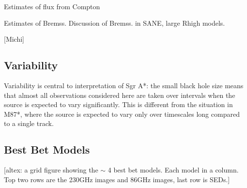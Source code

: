 Estimates of flux from Compton

Estimates of Bremss.  Discussion of Bremss. in SANE, large Rhigh models.

[Michi]

\subsection{Variability}

Variability is central to interpretation of Sgr A*: the small black hole size means that almost all observations considered here are taken over intervals when the source is expected to vary significantly.  This is different from the situation in M87*, where the source is expected to vary only over timescales long compared to a single track.

\subsection{Best Bet Models}

\begin{figure*}
    \centering
    [altex: a grid figure showing the $\sim$ 4 best bet models.  Each model in a column.  Top two rows are the 230GHz images and 86GHz images, last row is SEDs.]
    \caption{Best bet models.  Each column corresponds to one best bet model, top row shows the 230GHz image, middle row shows the 86GHz images, and the bottle row shows the SEDs.}
    \label{fig:my_label}
\end{figure*}